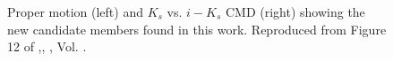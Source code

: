  \begin{figure}[ht]
\begin{center}
\caption{Proper motion (left) and $K_s$ vs. $i-K_s$ CMD (right) showing the new candidate members found in this work. Reproduced from Figure 12 of \citet{Olivares2017},\textit{}, , Vol. .}
\label{fig:newones}
\end{center}
\end{figure}


